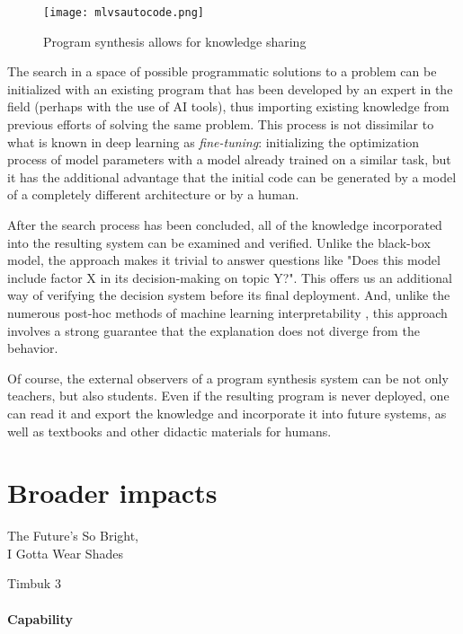 \begin{figure}[H]
    \centering
    \texttt{[image: mlvsautocode.png]}
    \caption{Program synthesis allows for knowledge sharing}
    \label{fig:mlvsautocode}
\end{figure}

The search in a space of possible programmatic solutions to a problem can be initialized with an existing program that has been developed by an expert in the field (perhaps with the  use of AI tools), thus \textcolor{accent}{importing existing knowledge} from previous efforts of solving the same problem.
This process is not dissimilar to what is known in deep learning as \emph{fine-tuning}: initializing the optimization process of model parameters with a model already trained on a similar task, but it has the additional advantage that the initial code can be generated by a model of a completely different architecture or by a human.

After the search process has been concluded, all of the knowledge incorporated into the resulting system can be \textcolor{accent}{examined and verified}. 
Unlike the black-box model, the approach makes it trivial to answer questions like "Does this model include factor X in its decision-making on topic Y?".
This offers us an additional way of verifying the decision system before its final deployment. 
And, unlike the numerous post-hoc methods of machine learning interpretability \cite{linardatosExplainableAiReview2020}, this approach involves a strong guarantee that the explanation does not diverge from the behavior.

Of course, the external observers of a program synthesis system can be not only teachers, but also students. 
Even if the resulting program is never deployed, one can read it and \textcolor{accent}{export the knowledge} and incorporate it into future systems, as well as textbooks and other didactic materials for humans.

\newpage
\section{Broader impacts}

\epigraph{The Future's So Bright, \\ I Gotta Wear Shades}{Timbuk 3}

\paragraph{Capability}

